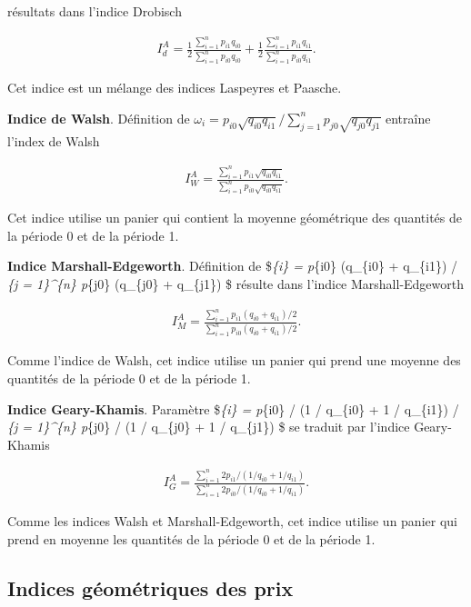 \documentclass[]{article}
\begin{document}
résultats dans l'indice Drobisch

\begin{align*}
I^{A}_{d} = \frac{1}{2} \frac{\sum_{i = 1}^{n} p_{i1} q_{i0}}{\sum_{i = 1}^{n} p_{i0} q_{i0}} + \frac{1}{2} \frac{\sum_{i = 1}^{n} p_{i1} q_{i1}}{\sum_{i = 1}^{n} p_{i0} q_{i1}}.
\end{align*}

Cet indice est un mélange des indices Laspeyres et Paasche.

\textbf{Indice de Walsh}. Définition de \(\omega_{i} = p_{i0} \sqrt{q_{i0} q_{i1}} / \sum_{j = 1}^{n} p_{j0} \sqrt{q_{j0} q_{j1}}\) entraîne l'index de Walsh

\begin{align*}
I^{A}_{W} = \frac{\sum_{i = 1}^{n} p_{i1} \sqrt{q_{i0} q_{i1}}}{\sum_{i = 1}^{n} p_{i0} \sqrt{q_{i0} q_{i1}}}.
\end{align*}

Cet indice utilise un panier qui contient la moyenne géométrique des quantités de la période 0 et de la période 1.

\textbf{Indice Marshall-Edgeworth}. Définition de \$\omega\emph{\{i\} = p}\{i0\} (q\_\{i0\} + q\_\{i1\}) / \sum\emph{\{j = 1\}\^{}\{n\} p}\{j0\} (q\_\{j0\} + q\_\{j1\}) \$ résulte dans l'indice Marshall-Edgeworth

\begin{align*}
I^{A}_{M} = \frac{\sum_{i = 1}^{n} p_{i1} (q_{i0} + q_{i1}) / 2}{\sum_{i = 1}^{n} p_{i0} (q_{i0} + q_{i1}) / 2}.
\end{align*}

Comme l'indice de Walsh, cet indice utilise un panier qui prend une moyenne des quantités de la période 0 et de la période 1.

\textbf{Indice Geary-Khamis}. Paramètre \$\omega\emph{\{i\} = p}\{i0\} / (1 / q\_\{i0\} + 1 / q\_\{i1\}) / \sum\emph{\{j = 1\}\^{}\{n\} p}\{j0\} / (1 / q\_\{j0\} + 1 / q\_\{j1\}) \$ se traduit par l'indice Geary-Khamis

\begin{align*}
I^{A}_{G} = \frac{\sum_{i = 1}^{n} 2 p_{i1} / (1 / q_{i0} + 1 / q_{i1})}{\sum_{i = 1}^{n} 2 p_{i0} / (1 / q_{i0} + 1 / q_{i1})}.
\end{align*}

Comme les indices Walsh et Marshall-Edgeworth, cet indice utilise un panier qui prend en moyenne les quantités de la période 0 et de la période 1.

\hypertarget{indices-guxe9omuxe9triques-des-prix}{%
\subsection{Indices géométriques des prix}\label{indices-guxe9omuxe9triques-des-prix}}
\end{document}
